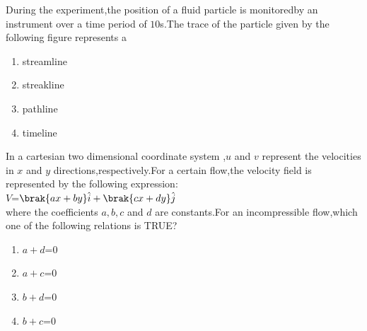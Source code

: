 \iffalse
\chapter{2017}
\author{EE24BTECH11060}
\section{xe}
\fi
    \item During the experiment,the position of a fluid particle is monitoredby an instrument over a time period of $10$s.The trace of the particle given by the following figure represents a
    \begin{enumerate}
        \item streamline
        \item streakline
        \item pathline
        \item timeline
    \end{enumerate}
    \item In a cartesian two dimensional coordinate system ,$u$ and $v$ represent the velocities in $x$ and $y$ directions,respectively.For a certain flow,the velocity field is represented by the following expression:\\
    $V$=$\brak{ax+by}\hat{i}+\brak{cx+dy}\hat{j}$\\
    where the coefficients $a,b,c$ and $d$ are constants.For an incompressible flow,which one of the following relations is TRUE?
    \begin{enumerate}
        \item $a+d$=$0$
        \item $a+c$=$0$
        \item $b+d$=$0$
        \item $b+c$=$0$
    \end{enumerate}
